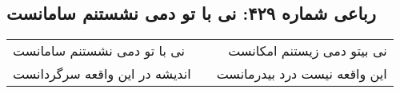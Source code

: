 \begin{center}
\section*{رباعی شماره ۴۲۹: نی با تو دمی نشستنم سامانست}
\label{sec:0429}
\begin{longtable}{l p{0.5cm} r}
نی با تو دمی نشستنم سامانست
&&
نی بیتو دمی زیستنم امکانست
\\
اندیشه در این واقعه سرگردانست
&&
این واقعه نیست درد بیدرمانست
\\
\end{longtable}
\end{center}
